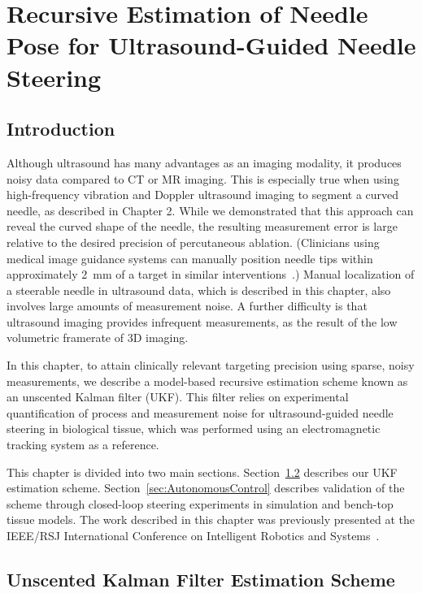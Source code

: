 \chapter[Recursive Estimation of Needle Pose]{Recursive Estimation of Needle Pose for Ultrasound-Guided Needle Steering}

\section{Introduction}
Although ultrasound has many advantages as an imaging modality, it produces noisy data compared to CT or MR imaging. This is especially true when using high-frequency vibration and Doppler ultrasound imaging to segment a curved needle, as described in Chapter 2. While we demonstrated that this approach can reveal the curved shape of the needle, the resulting measurement error is large relative to the desired precision of percutaneous ablation. (Clinicians using medical image guidance systems can manually position needle tips within approximately 2~mm of a target in similar interventions~\cite{Crocetti2008}.) Manual localization of a steerable needle in ultrasound data, which is described in this chapter, also involves large amounts of measurement noise. A further difficulty is that ultrasound imaging provides infrequent measurements, as the result of the low volumetric framerate of 3D imaging. 

In this chapter, to attain clinically relevant targeting precision using sparse, noisy measurements, we describe a model-based recursive estimation scheme known as an unscented Kalman filter (UKF). This filter relies on experimental quantification of process and measurement noise for ultrasound-guided needle steering in biological tissue, which was performed using an electromagnetic tracking system as a reference.
 
This chapter is divided into two main sections. Section~\ref{sec:UKF} describes our UKF estimation scheme. Section~\ref{sec:AutonomousControl} describes validation of the scheme through closed-loop steering experiments in simulation and bench-top tissue models. The work described in this chapter was previously presented at the IEEE/RSJ International Conference on Intelligent Robotics and Systems~\cite{Adebar2014a}.

\section[UKF Estimation Scheme]{Unscented Kalman Filter Estimation Scheme}
\label{sec:UKF}

